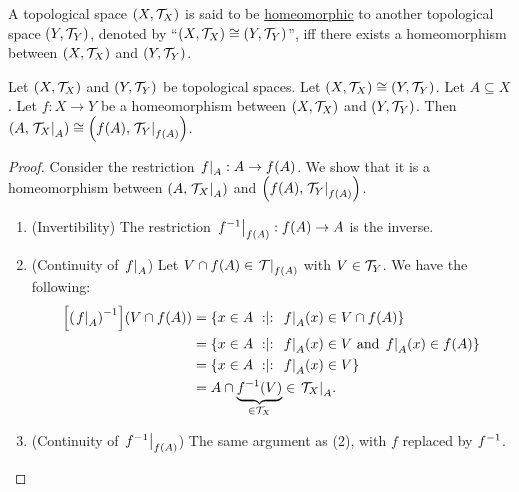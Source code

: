 \documentclass[11pt,reqno]{amsart}
\begin{document}
\begin{Def}
A topological space $(X,\mathcal{T}_X)$ is said to be \ul{homeomorphic} to another topological space $(Y,\mathcal{T}_Y)$,
denoted by ``$(X,\mathcal{T}_X)\cong(Y,\mathcal{T}_Y)$'', iff
there exists a homeomorphism between $(X,\mathcal{T}_X)$ and $(Y,\mathcal{T}_Y)$.
\end{Def}

\begin{Thm}\label{res}
Let $(X,\mathcal{T}_X)$ and $(Y,\mathcal{T}_Y)$ be topological spaces.
Let $(X,\mathcal{T}_X)\cong(Y,\mathcal{T}_Y)$.
Let $A\subseteq X$.
Let $f:X\to Y$ be a homeomorphism between $(X,\mathcal{T}_X)$ and $(Y,\mathcal{T}_Y)$.
Then $\Br{A,\eval{\T_X}_A}\cong\Br{f(A),\eval{\T_Y}_{f(A)}}$.
\end{Thm}
\begin{proof}
Consider the restriction $\eval{f}_A:A\to f(A)$.
We show that it is a homeomorphism between $\Br{A,\eval{\T_X}_A}$ and
$\Br{f(A),\eval{\T_Y}_{f(A)}}$.
\begin{enumerate}
\item (Invertibility)
The restriction $\eval{f\inv}_{f(A)}:f(A)\to A$ is the inverse.

\item (Continuity of $\eval{f}_A$)
Let $V\cap f(A)\in\eval{\T}_{f(A)}$ with $V\in\mathcal{T}_Y$.
We have the following:
\[\begin{aligned}
\FUNC{\Br{\eval{f}_A}\inv}{V\cap f(A)}
&=\set{x\in A\st\eval{f}_A(x)\in V\cap f(A)}\\
&=\set{x\in A\st\eval{f}_A(x)\in V\tand \eval{f}_A(x)\in f(A)}\\
&=\set{x\in A\st \eval{f}_A(x)\in V}\\
&=A\cap\underbrace{f\inv(V)}_{\in\T_X}\in\eval{\T_X}_{A}.
\end{aligned}\]

\item (Continuity of $\eval{f\inv}_{f(A)}$)
The same argument as (2), with $f$ replaced by $f^{-1}$.
\end{enumerate}
\end{proof}
\end{document}
